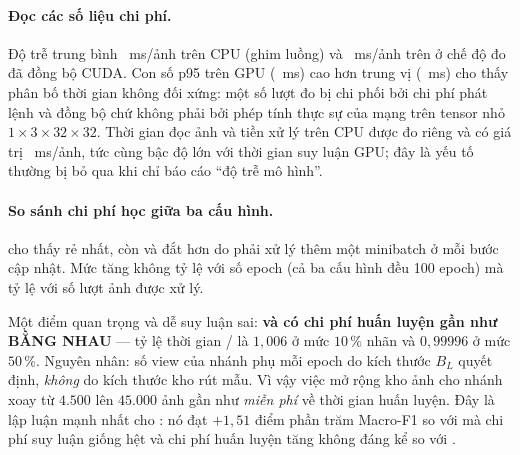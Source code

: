 



\paragraph{Đọc các số liệu chi phí.}
Độ trễ trung bình \RLatMeanCpu{}~ms/ảnh trên CPU (ghim \RLatThreads{} luồng) và
\RLatMeanGpu{}~ms/ảnh trên \REnvGpu{} ở chế độ đo đã đồng bộ CUDA. Con số p95 trên GPU
(\RLatPNinetyFiveGpu{}~ms) cao hơn trung vị (\RLatMedianGpu{}~ms) cho thấy phân bố thời gian không đối
xứng: một số lượt đo bị chi phối bởi chi phí phát lệnh và đồng bộ chứ không phải bởi phép tính
thực sự của mạng trên tensor nhỏ $1 \times 3 \times 32 \times 32$. Thời gian đọc ảnh và tiền xử
lý trên CPU được đo riêng và có giá trị \RPreprocessMs{}~ms/ảnh, tức cùng bậc độ lớn với thời
gian suy luận GPU; đây là yếu tố thường bị bỏ qua khi chỉ báo cáo \enquote{độ trễ mô hình}.

\paragraph{So sánh chi phí học giữa ba cấu hình.}
 cho thấy  rẻ nhất, còn  và  đắt hơn do phải
xử lý thêm một minibatch ở mỗi bước cập nhật. Mức tăng không tỷ lệ với số epoch (cả ba cấu hình
đều 100 epoch) mà tỷ lệ với số lượt ảnh được xử lý.

Một điểm quan trọng và dễ suy luận sai: \textbf{ và  có chi phí huấn luyện
gần như BẰNG NHAU} — tỷ lệ thời gian / là $1{,}006$ ở mức $10\,\%$ nhãn và
$0{,}99996$ ở mức $50\,\%$. Nguyên nhân: số view của nhánh phụ mỗi epoch do kích thước $B_L$
quyết định, \emph{không} do kích thước kho rút mẫu. Vì vậy việc mở rộng kho ảnh cho nhánh xoay
từ $4.500$ lên $45.000$ ảnh gần như \emph{miễn phí} về thời gian huấn luyện. Đây là lập luận
mạnh nhất cho : nó đạt $+1{,}51$ điểm phần trăm Macro-F1 so với  mà chi phí suy
luận giống hệt và chi phí huấn luyện tăng không đáng kể so với .
